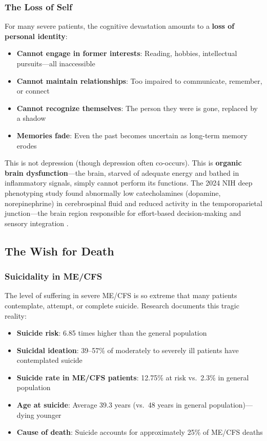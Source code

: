 \subsubsection{The Loss of Self}
\label{subsec:loss-of-self}

For many severe patients, the cognitive devastation amounts to a \textbf{loss of personal identity}:

\begin{itemize}
    \item \textbf{Cannot engage in former interests}: Reading, hobbies, intellectual pursuits---all inaccessible
    \item \textbf{Cannot maintain relationships}: Too impaired to communicate, remember, or connect
    \item \textbf{Cannot recognize themselves}: The person they were is gone, replaced by a shadow
    \item \textbf{Memories fade}: Even the past becomes uncertain as long-term memory erodes
\end{itemize}

This is not depression (though depression often co-occurs). This is \textbf{organic brain dysfunction}---the brain, starved of adequate energy and bathed in inflammatory signals, simply cannot perform its functions. The 2024 NIH deep phenotyping study found abnormally low catecholamines (dopamine, norepinephrine) in cerebrospinal fluid and reduced activity in the temporoparietal junction---the brain region responsible for effort-based decision-making and sensory integration \cite{NIH2024deeppheno}.

\subsection{The Wish for Death}
\label{sec:wish-for-death}

\subsubsection{Suicidality in ME/CFS}
\label{subsec:suicidality}

The level of suffering in severe ME/CFS is so extreme that many patients contemplate, attempt, or complete suicide. Research documents this tragic reality:

\begin{itemize}
    \item \textbf{Suicide risk}: 6.85 times higher than the general population \cite{Roberts2016}
    \item \textbf{Suicidal ideation}: 39--57\% of moderately to severely ill patients have contemplated suicide \cite{Chu2021suicide}
    \item \textbf{Suicide rate in ME/CFS patients}: 12.75\% at risk vs.\ 2.3\% in general population
    \item \textbf{Age at suicide}: Average 39.3 years (vs.\ 48 years in general population)---dying younger
    \item \textbf{Cause of death}: Suicide accounts for approximately 25\% of ME/CFS deaths
\end{itemize}

